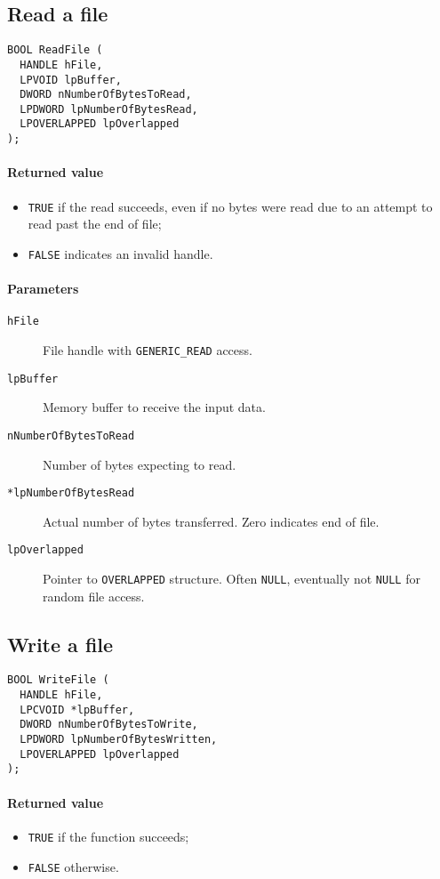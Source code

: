 \subsection{Read a file}
\begin{verbatim}
BOOL ReadFile (
  HANDLE hFile,
  LPVOID lpBuffer,
  DWORD nNumberOfBytesToRead,
  LPDWORD lpNumberOfBytesRead,
  LPOVERLAPPED lpOverlapped
);
\end{verbatim}

\paragraph{Returned value}
\begin{itemize}
\item \texttt{TRUE} if the read succeeds, even if no bytes were read due to an attempt to read past the end of file;
\item \texttt{FALSE} indicates an invalid handle.
\end{itemize}

\paragraph{Parameters}
\label{par:read_parameters}
\begin{description}
\item [\texttt{hFile}] File handle with \texttt{GENERIC\_READ} access.
\item [\texttt{lpBuffer}] Memory buffer to receive the input data.
\item [\texttt{nNumberOfBytesToRead}] Number of bytes expecting to read.
\item [\texttt{*lpNumberOfBytesRead}] Actual number of bytes transferred. Zero indicates end of file.
\item [\texttt{lpOverlapped}] Pointer to \texttt{OVERLAPPED} structure. Often \texttt{NULL}, eventually not \texttt{NULL} for random file access.
\end{description}

\subsection{Write a file}
\begin{verbatim}
BOOL WriteFile (
  HANDLE hFile,
  LPCVOID *lpBuffer,
  DWORD nNumberOfBytesToWrite,
  LPDWORD lpNumberOfBytesWritten,
  LPOVERLAPPED lpOverlapped
);
\end{verbatim}

\paragraph{Returned value}
\begin{itemize}
\item \texttt{TRUE} if the function succeeds;
\item \texttt{FALSE} otherwise.
\end{itemize}

